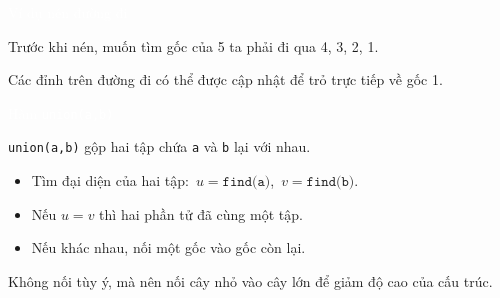 \documentclass{beamer}
\newcommand{\hlgreen}[1]{\textcolor{mygreen}{#1}}
\newcommand{\hlpurple}[1]{\textcolor{mypurple}{#1}}
\newcommand{\hlwhite}[1]{\textcolor{white}{#1}}
\begin{document}
\begin{frame}{\hlwhite{Ví dụ nén đường đi}}
\centering
{}

\vspace{0.2cm}
\hlpurple{Trước khi nén, muốn tìm gốc của 5 ta phải đi qua 4, 3, 2, 1.}

\pause

\begin{tcolorbox}[title=\textbf{\hlgreen{Sau khi gọi \texttt{find(5)}}}]
Các đỉnh trên đường đi có thể được cập nhật để trỏ trực tiếp về gốc 1.
\end{tcolorbox}
\end{frame}


\begin{frame}{\hlwhite{Hàm \texttt{union(a,b)}}}
\begin{tcolorbox}[title=\textbf{\hlgreen{Mục đích}}]
\texttt{union(a,b)} gộp hai tập chứa \texttt{a} và \texttt{b} lại với nhau.
\end{tcolorbox}

\begin{itemize}
  \item Tìm đại diện của hai tập: \(\,u = \texttt{find(a)}\), \(\,v = \texttt{find(b)}\).
  \item Nếu \(u = v\) thì hai phần tử đã cùng một tập.
  \item Nếu khác nhau, nối một gốc vào gốc còn lại.
\end{itemize}

\pause

\begin{tcolorbox}[title=\textbf{\hlgreen{Nguyên tắc}}]
Không nối tùy ý, mà nên nối cây nhỏ vào cây lớn để giảm độ cao của cấu trúc.
\end{tcolorbox}
\end{frame}

\end{document}
